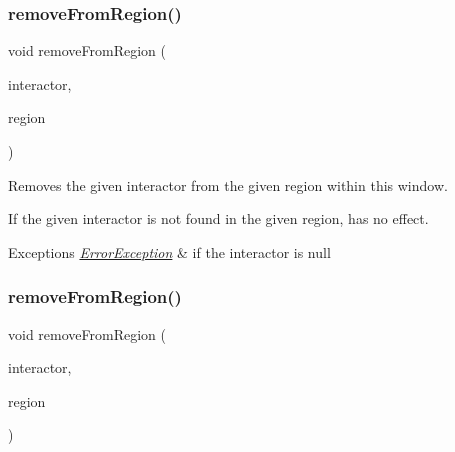\mbox{\label{classGWindow_a87a74b040025878283ba685e30d5104f}} 
\subsubsection{\texorpdfstring{remove\+From\+Region()}{removeFromRegion()}\hspace{0.1cm}{\footnotesize\ttfamily [1/4]}}
{\footnotesize\ttfamily void remove\+From\+Region (\begin{DoxyParamCaption}\item[{\mbox{\hyperlink{classGInteractor}{G\+Interactor}} $\ast$}]{interactor,  }\item[{\mbox{\hyperlink{classGWindow_a81a01a86de31071a92e6cce0bab9bc4b}{Region}}}]{region }\end{DoxyParamCaption})\hspace{0.3cm}{\ttfamily [virtual]}}



Removes the given interactor from the given region within this window. 

If the given interactor is not found in the given region, has no effect. 
\begin{DoxyExceptions}{Exceptions}
{\em \mbox{\hyperlink{classErrorException}{Error\+Exception}}} & if the interactor is null \\
\hline
\end{DoxyExceptions}
\mbox{\label{classGWindow_a16268c8344a5a5d9b10bde95764112d1}} 
\subsubsection{\texorpdfstring{remove\+From\+Region()}{removeFromRegion()}\hspace{0.1cm}{\footnotesize\ttfamily [2/4]}}
{\footnotesize\ttfamily void remove\+From\+Region (\begin{DoxyParamCaption}\item[{\mbox{\hyperlink{classGInteractor}{G\+Interactor}} $\ast$}]{interactor,  }\item[{const std\+::string \&}]{region }\end{DoxyParamCaption})\hspace{0.3cm}{\ttfamily [virtual]}}



